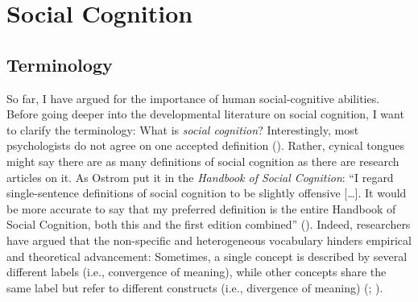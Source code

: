 \documentclass[
]{scrbook}
\begin{document}
\section{Social Cognition}\label{intro-socialcognition}

\subsection{Terminology}\label{terminology}

So far, I have argued for the importance of human social-cognitive abilities. Before going deeper into the developmental literature on social cognition, I want to clarify the terminology: What is \emph{social cognition}? Interestingly, most psychologists do not agree on one accepted definition (). Rather, cynical tongues might say there are as many definitions of social cognition as there are research articles on it. As Ostrom put it in the \emph{Handbook of Social Cognition}: ``I regard single-sentence definitions of social cognition to be slightly offensive {[}\ldots{]}. It would be more accurate to say that my preferred definition is the entire Handbook of Social Cognition, both this and the first edition combined'' (). Indeed, researchers have argued that the non-specific and heterogeneous vocabulary hinders empirical and theoretical advancement: Sometimes, a single concept is described by several different labels (i.e., convergence of meaning), while other concepts share the same label but refer to different constructs (i.e., divergence of meaning) (; ).
\end{document}
